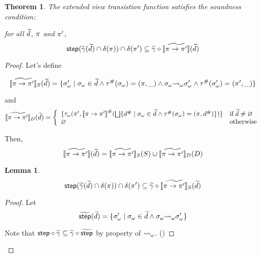 \newtheorem{theorem}{Theorem}

\begin{theorem}
  The extended view transistion function satisfies the soundness condition:
  
  for all $\widetilde{d}$, $\pi$ and $\pi'$,
  \[
    \textsf{step}(\widetilde{\gamma}(\widetilde{d}) \cap \delta(\pi))
    \cap \delta(\pi') \subseteq \widetilde{\gamma} \circ
    [\![{\widetilde{\pi \rightarrow \pi'}}]\!](\widetilde{d})
  \]
\end{theorem}

\begin{proof}

Let's define

\[
  [\![{\widetilde{\pi \rightarrow \pi'}}]\!]_S(\widetilde{d}) = \{
      {\sigma}_\omega' \mid {\sigma}_\omega \in \widetilde{d} \wedge
      {\tau}^{\#}({\sigma}_\omega) = (\pi, \_) \wedge
      {\sigma}_\omega {\leadsto}_\omega {\sigma}_\omega' \wedge
      {\tau}^{\#}({\sigma}_\omega') = (\pi', \_)
    \}
\]

and
\[
  [\![{\widetilde{\pi \rightarrow \pi'}}]\!]_D(\widetilde{d}) = 
  \left\{
    \begin{array}{ll}
      \{ {\tau}_\omega(\pi', {[\![{\pi \rightarrow \pi'}]\!]}^{\#}(\bigsqcup \{
        {d}^{\#} \mid {\sigma}_\omega \in \widetilde{d} \wedge {\tau}^{\#}({\sigma}_\omega) = (\pi, {d}^{\#}) \}) \}
      & \text{if} \; \widetilde{d} \neq \varnothing\\
      \varnothing & \text{otherwise}\\
    \end{array}
    \right.
\]

Then,
\[
  [\![{\widetilde{\pi \rightarrow \pi'}}]\!](\widetilde{d}) =
  [\![{\widetilde{\pi \rightarrow \pi'}}]\!]_S(S) \cup
  [\![{\widetilde{\pi \rightarrow \pi'}}]\!]_D(D)
\]

\newtheorem{lemma}{Lemma}
\begin{lemma}
\[
  \textsf{step}(\widetilde{\gamma}(\widetilde{d}) \cap \delta(\pi))
  \cap \delta(\pi') \subseteq \widetilde{\gamma} \circ
  [\![{\widetilde{\pi \rightarrow \pi'}}]\!]_S(\widetilde{d})
\]
\end{lemma}

\begin{proof}

Let
\[
  \widetilde{\textsf{step}}(\widetilde{d}) = \{
      {\sigma}_\omega' \mid {\sigma}_\omega \in \widetilde{d} \wedge
      {\sigma}_\omega {\leadsto}_\omega {\sigma}_\omega'
    \}
\]

Note that 
$\textsf{step} \circ \widetilde{\gamma} \subseteq \widetilde{\gamma} \circ \widetilde{\textsf{step}}$
by property of ${\leadsto}_\omega$. (\todo)


\end{proof}
\end{proof}

